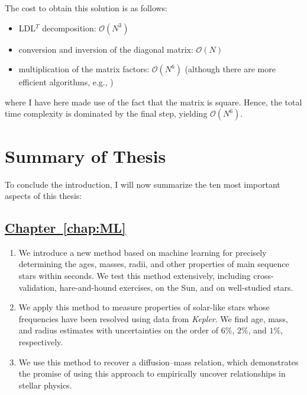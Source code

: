 The cost to obtain this solution is as follows: 
\begin{itemize}
    \item LDL$^T$ decomposition: ${\mathcal{O}(N^3)}$ \citep{6710599}
    \item conversion and inversion of the diagonal matrix: ${\mathcal{O}(N)}$ %
    \item multiplication of the matrix factors: ${\mathcal{O}(N^6)}$ %
    (although there are more efficient algorithms, e.g., \citealt{COPPERSMITH1990251})
\end{itemize}
where I have here made use of the fact that the matrix is square. 
Hence, the total time complexity is dominated by the final step, yielding $\mathcal{O}(N^6)$. 


\newpage
\section{Summary of Thesis}
To conclude the introduction, I will now summarize the ten most important aspects of this thesis: 

\subsection*{\hspace*{0.5cm}\hyperref[chap:ML]{Chapter~\ref{chap:ML}} \citep{2016apj...830...31b}}
\begin{enumerate}
    \item We introduce a new method based on machine learning for precisely determining the ages, masses, radii, and other properties of main sequence stars within seconds. 
    We test this method extensively, including cross-validation, hare-and-hound exercises, on the Sun, and on well-studied stars. 
    \item We apply this method to measure properties of solar-like stars whose frequencies have been resolved using data from \emph{Kepler}. 
    We find age, mass, and radius estimates with uncertainties on the order of $6\%$, $2\%$, and $1\%$, respectively. 
    \item We use this method to recover a diffusion--mass relation, which demonstrates the promise of using this approach to empirically uncover relationships in stellar physics. %
\end{enumerate}

